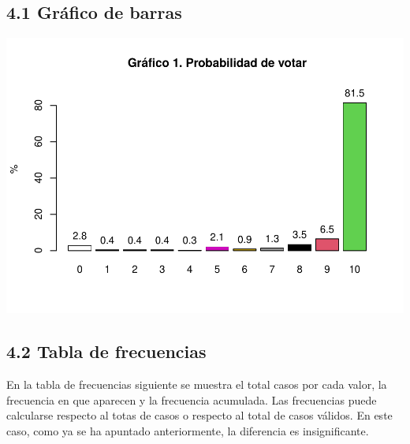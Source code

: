 \documentclass[
]{article}
\newenvironment{Shaded}{\begin{snugshade}}{\end{snugshade}}
\newcommand{\AttributeTok}[1]{\textcolor[rgb]{0.13,0.29,0.53}{#1}}
\newcommand{\ConstantTok}[1]{\textcolor[rgb]{0.56,0.35,0.01}{#1}}
\newcommand{\DecValTok}[1]{\textcolor[rgb]{0.00,0.00,0.81}{#1}}
\newcommand{\FunctionTok}[1]{\textcolor[rgb]{0.13,0.29,0.53}{\textbf{#1}}}
\newcommand{\NormalTok}[1]{#1}
\newcommand{\OtherTok}[1]{\textcolor[rgb]{0.56,0.35,0.01}{#1}}
\newcommand{\SpecialCharTok}[1]{\textcolor[rgb]{0.81,0.36,0.00}{\textbf{#1}}}
\newcommand{\StringTok}[1]{\textcolor[rgb]{0.31,0.60,0.02}{#1}}
\begin{document}
\hypertarget{gruxe1fico-de-barras}{%
\subsection{4.1 Gráfico de barras}\label{gruxe1fico-de-barras}}

\begin{Shaded}
\end{Shaded}

\includegraphics{probabilidadVoto_files/figure-latex/graficoBarras-1.pdf}

\hypertarget{tabla-de-frecuencias}{%
\subsection{4.2 Tabla de frecuencias}\label{tabla-de-frecuencias}}

En la tabla de frecuencias siguiente se muestra el total casos por cada
valor, la frecuencia en que aparecen y la frecuencia acumulada. Las
frecuencias puede calcularse respecto al totas de casos o respecto al
total de casos válidos. En este caso, como ya se ha apuntado
anteriormente, la diferencia es insignificante.
\end{document}
